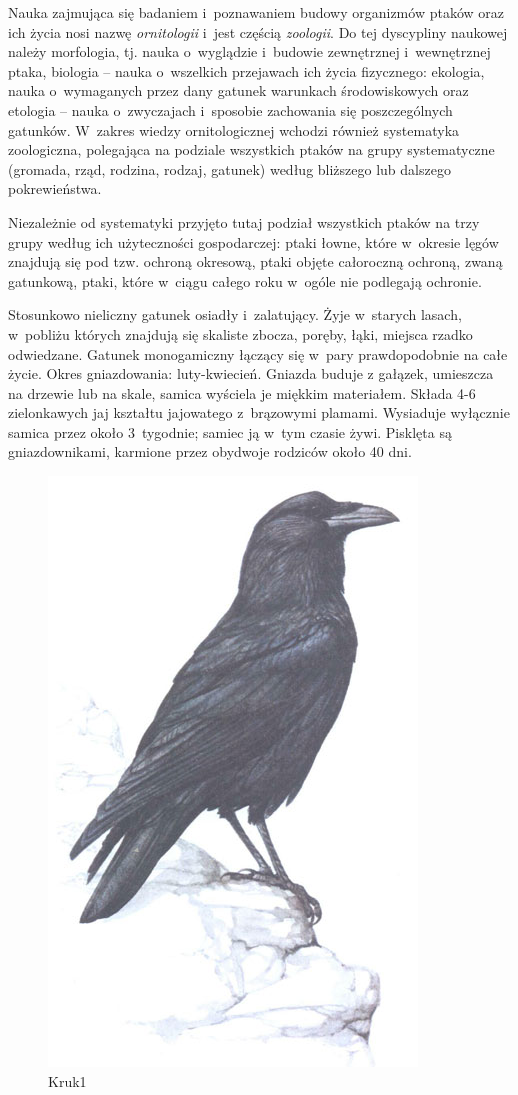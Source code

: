 \documentclass[a4paper,10pt]{report}
\begin{document}
Nauka zajmująca się badaniem i~poznawaniem budowy organizmów ptaków oraz ich życia nosi nazwę \emph{ornitologii} i~jest częścią \emph{zoologii}. Do tej dyscypliny naukowej należy morfologia, tj. nauka o~wyglądzie i~budowie zewnętrznej i~wewnętrznej ptaka, biologia -- nauka o~wszelkich przejawach ich życia fizycznego: ekologia, nauka o~wymaganych przez dany gatunek warunkach środowiskowych oraz etologia -- nauka o~zwyczajach i~sposobie zachowania się poszczególnych gatunków. W~zakres wiedzy ornitologicznej wchodzi również systematyka zoologiczna, polegająca na podziale wszystkich ptaków na grupy systematyczne (gromada, rząd, rodzina, rodzaj, gatunek) według bliższego lub dalszego pokrewieństwa. 

Niezależnie od systematyki przyjęto tutaj podział wszystkich ptaków na trzy grupy według ich użyteczności gospodarczej: ptaki łowne, które w~okresie lęgów znajdują się pod tzw. ochroną okresową, ptaki objęte całoroczną ochroną, zwaną gatunkową, ptaki, które w~ciągu całego roku w~ogóle nie podlegają ochronie.


Stosunkowo nieliczny gatunek osiadły i~zalatujący. Żyje w~starych lasach, w~pobliżu których znajdują się skaliste zbocza, poręby, łąki, miejsca rzadko odwiedzane. Gatunek monogamiczny łączący się w~pary prawdopodobnie na całe życie. Okres gniazdowania: luty-kwiecień. Gniazda buduje z gałązek, umieszcza na drzewie lub na skale, samica wyściela je miękkim materiałem. Składa 4-6 zielonkawych jaj kształtu jajowatego z~brązowymi plamami. Wysiaduje wyłącznie samica przez około 3~tygodnie; samiec ją w~tym czasie żywi. Pisklęta są gniazdownikami, karmione przez obydwoje rodziców około 40 dni. 

\begin{figure}[t]
\centerline{\includegraphics[scale=0.2]{kruk}}
\caption{Kruk1}
\end{figure}
\end{document}
